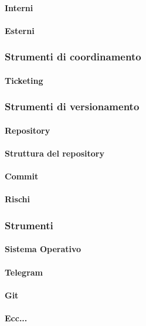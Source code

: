  \paragraph{Interni}
 \paragraph{Esterni} 
\subsubsection{Strumenti di coordinamento}
 \paragraph{Ticketing}
\subsubsection{Strumenti di versionamento}
 \paragraph{Repository}
 \paragraph{Struttura del repository}
 \paragraph{Commit}
 \paragraph{Rischi} 
\subsubsection{Strumenti}
 \paragraph{Sistema Operativo}
 \paragraph{Telegram}
 \paragraph{Git}
 \paragraph{Ecc...}